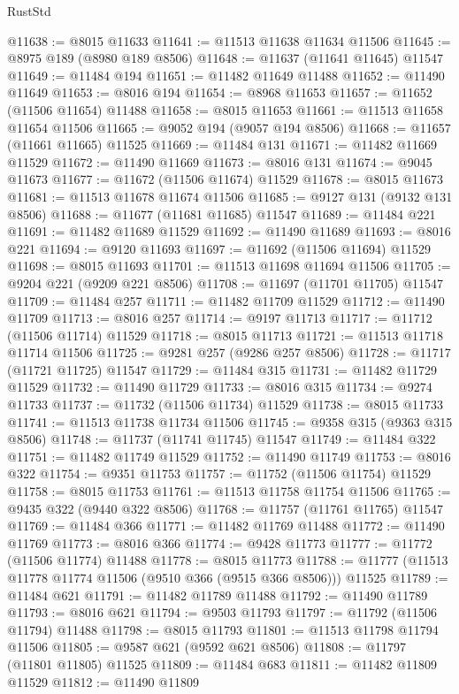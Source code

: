 \begin{lexlean}{RustStd}
\begin{coremodule}
@11638 := @8015 @11633
@11641 := @11513 @11638 @11634 @11506
@11645 := @8975 @189 (@8980 @189 @8506)
@11648 := @11637 (@11641 @11645) @11547
@11649 := @11484 @194
@11651 := @11482 @11649 @11488
@11652 := @11490 @11649
@11653 := @8016 @194
@11654 := @8968 @11653
@11657 := @11652 (@11506 @11654) @11488
@11658 := @8015 @11653
@11661 := @11513 @11658 @11654 @11506
@11665 := @9052 @194 (@9057 @194 @8506)
@11668 := @11657 (@11661 @11665) @11525
@11669 := @11484 @131
@11671 := @11482 @11669 @11529
@11672 := @11490 @11669
@11673 := @8016 @131
@11674 := @9045 @11673
@11677 := @11672 (@11506 @11674) @11529
@11678 := @8015 @11673
@11681 := @11513 @11678 @11674 @11506
@11685 := @9127 @131 (@9132 @131 @8506)
@11688 := @11677 (@11681 @11685) @11547
@11689 := @11484 @221
@11691 := @11482 @11689 @11529
@11692 := @11490 @11689
@11693 := @8016 @221
@11694 := @9120 @11693
@11697 := @11692 (@11506 @11694) @11529
@11698 := @8015 @11693
@11701 := @11513 @11698 @11694 @11506
@11705 := @9204 @221 (@9209 @221 @8506)
@11708 := @11697 (@11701 @11705) @11547
@11709 := @11484 @257
@11711 := @11482 @11709 @11529
@11712 := @11490 @11709
@11713 := @8016 @257
@11714 := @9197 @11713
@11717 := @11712 (@11506 @11714) @11529
@11718 := @8015 @11713
@11721 := @11513 @11718 @11714 @11506
@11725 := @9281 @257 (@9286 @257 @8506)
@11728 := @11717 (@11721 @11725) @11547
@11729 := @11484 @315
@11731 := @11482 @11729 @11529
@11732 := @11490 @11729
@11733 := @8016 @315
@11734 := @9274 @11733
@11737 := @11732 (@11506 @11734) @11529
@11738 := @8015 @11733
@11741 := @11513 @11738 @11734 @11506
@11745 := @9358 @315 (@9363 @315 @8506)
@11748 := @11737 (@11741 @11745) @11547
@11749 := @11484 @322
@11751 := @11482 @11749 @11529
@11752 := @11490 @11749
@11753 := @8016 @322
@11754 := @9351 @11753
@11757 := @11752 (@11506 @11754) @11529
@11758 := @8015 @11753
@11761 := @11513 @11758 @11754 @11506
@11765 := @9435 @322 (@9440 @322 @8506)
@11768 := @11757 (@11761 @11765) @11547
@11769 := @11484 @366
@11771 := @11482 @11769 @11488
@11772 := @11490 @11769
@11773 := @8016 @366
@11774 := @9428 @11773
@11777 := @11772 (@11506 @11774) @11488
@11778 := @8015 @11773
@11788 := @11777 (@11513 @11778 @11774 @11506 (@9510 @366 (@9515 @366 @8506))) @11525
@11789 := @11484 @621
@11791 := @11482 @11789 @11488
@11792 := @11490 @11789
@11793 := @8016 @621
@11794 := @9503 @11793
@11797 := @11792 (@11506 @11794) @11488
@11798 := @8015 @11793
@11801 := @11513 @11798 @11794 @11506
@11805 := @9587 @621 (@9592 @621 @8506)
@11808 := @11797 (@11801 @11805) @11525
@11809 := @11484 @683
@11811 := @11482 @11809 @11529
@11812 := @11490 @11809

\end{coremodule}
\end{lexlean}
